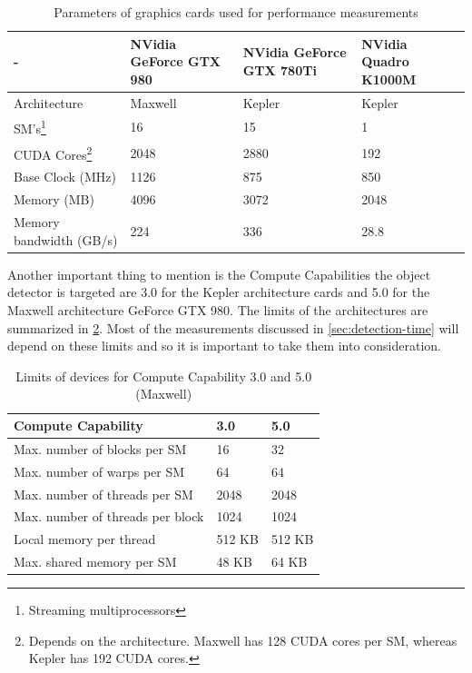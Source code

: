 \begin{center}
\begin{table}[htbp]
\begin{tabularx}{\textwidth}{| X | X | X | X |}
\hline
- & NVidia GeForce GTX 980 & NVidia GeForce GTX 780Ti & NVidia Quadro K1000M \\
\hline
Architecture & Maxwell & Kepler & Kepler \\
\hline
SM's\footnote{Streaming multiprocessors} & 16 & 15 & 1 \\
\hline
CUDA Cores\footnote{Depends on the architecture. Maxwell has 128 CUDA cores per SM, whereas Kepler has 192 CUDA cores.} & 2048 & 2880 & 192 \\
\hline
Base Clock (MHz) & 1126 & 875 & 850 \\
\hline
Memory (MB) & 4096 & 3072 & 2048 \\
\hline
Memory bandwidth (GB/s) & 224 & 336 & 28.8 \\
\hline
\end{tabularx}
\caption{Parameters of graphics cards used for performance measurements}
\label{tab:parameters-gpu}
\end{table}
\end{center}

Another important thing to mention is the Compute Capabilities the object detector is targeted are 3.0 for the Kepler architecture cards and 5.0 for the Maxwell architecture GeForce GTX 980. The limits of the architectures are summarized in \ref{tab:capability-3050}. Most of the measurements discussed in \ref{sec:detection-time} will depend on these limits and so it is important to take them into consideration.

\begin{table}[htbp]
\begin{center}
\begin{tabularx}{0.75\textwidth}{| X | X | X |}
\hline
Compute Capability & 3.0 & 5.0 \\
\hline
Max. number of blocks per SM & 16 & 32 \\
\hline
Max. number of warps per SM & 64 & 64 \\
\hline
Max. number of threads per SM & 2048 & 2048\\
\hline
Max. number of threads per block & 1024 & 1024\\
\hline
Local memory per thread & 512 KB & 512 KB \\
\hline
Max. shared memory per SM & 48 KB & 64 KB\\
\hline
\end{tabularx}
\end{center}
\caption{Limits of devices for Compute Capability 3.0 and 5.0 (Maxwell)}
\label{tab:capability-3050}
\end{table}

